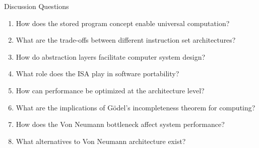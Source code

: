 \begin{frame}{Discussion Questions}
\begin{enumerate}
\item How does the stored program concept enable universal computation?
\item What are the trade-offs between different instruction set architectures?
\item How do abstraction layers facilitate computer system design?
\item What role does the ISA play in software portability?
\item How can performance be optimized at the architecture level?
\item What are the implications of Gödel's incompleteness theorem for computing?
\item How does the Von Neumann bottleneck affect system performance?
\item What alternatives to Von Neumann architecture exist?
\end{enumerate}
\end{frame}



